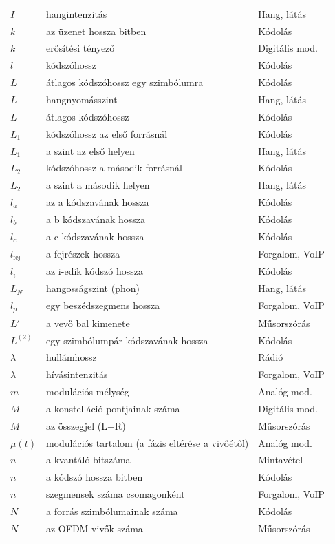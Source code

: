 {\begin{longtable}{@{}>{\raggedright\arraybackslash}p{2.4cm}>{\raggedright\arraybackslash}p{8.2cm}>{\raggedright\arraybackslash}p{3.8cm}@{}}
$I$ & hangintenzitás & Hang, látás\\
$k$ & az üzenet hossza bitben & Kódolás\\
$k$ & erősítési tényező & Digitális mod.\\
$l$ & kódszóhossz & Kódolás\\
$L$ & átlagos kódszóhossz egy szimbólumra & Kódolás\\
$L$ & hangnyomásszint & Hang, látás\\
$\bar L$ & átlagos kódszóhossz & Kódolás\\
$L_1$ & kódszóhossz az első forrásnál & Kódolás\\
$L_1$ & a szint az első helyen & Hang, látás\\
$L_2$ & kódszóhossz a második forrásnál & Kódolás\\
$L_2$ & a szint a második helyen & Hang, látás\\
$l_a$ & az a kódszavának hossza & Kódolás\\
$l_b$ & a b kódszavának hossza & Kódolás\\
$l_c$ & a c kódszavának hossza & Kódolás\\
$l_\text{fej}$ & a fejrészek hossza & Forgalom, VoIP\\
$l_i$ & az i-edik kódszó hossza & Kódolás\\
$L_N$ & hangosságszint (phon) & Hang, látás\\
$l_p$ & egy beszédszegmens hossza & Forgalom, VoIP\\
$L'$ & a vevő bal kimenete & Műsorszórás\\
$L^{(2)}$ & egy szimbólumpár kódszavának hossza & Kódolás\\
$\lambda$ & hullámhossz & Rádió\\
$\lambda$ & hívásintenzitás & Forgalom, VoIP\\
$m$ & modulációs mélység & Analóg mod.\\
$M$ & a konstelláció pontjainak száma & Digitális mod.\\
$M$ & az összegjel (L+R) & Műsorszórás\\
$\mu(t)$ & modulációs tartalom (a fázis eltérése a vivőétől) & Analóg mod.\\
$n$ & a kvantáló bitszáma & Mintavétel\\
$n$ & a kódszó hossza bitben & Kódolás\\
$n$ & szegmensek száma csomagonként & Forgalom, VoIP\\
$N$ & a forrás szimbólumainak száma & Kódolás\\
$N$ & az OFDM-vivők száma & Műsorszórás\\

\end{longtable}}
